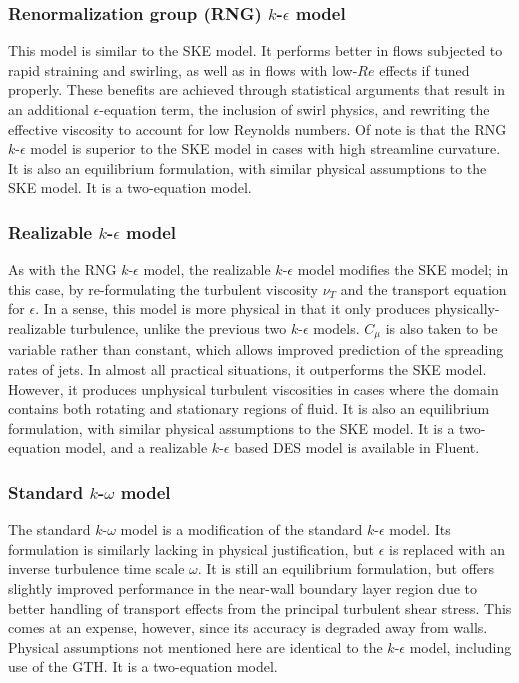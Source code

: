 \documentclass[11pt]{article}
\begin{document}
\subsubsection{Renormalization group (RNG) $k$-$\epsilon$ model}

This model is similar to the SKE model. It performs better in flows subjected to rapid straining and swirling, as well as in flows with low-$Re$ effects if tuned properly. These benefits are achieved through statistical arguments that result in an additional $\epsilon$-equation term, the inclusion of swirl physics, and rewriting the effective viscosity to account for low Reynolds numbers. Of note is that the RNG $k$-$\epsilon$ model is superior to the SKE model in cases with high streamline curvature. It is also an equilibrium formulation, with similar physical assumptions to the SKE model. It is a two-equation model.

\subsubsection{Realizable $k$-$\epsilon$ model}

As with the RNG $k$-$\epsilon$ model, the realizable $k$-$\epsilon$ model modifies the SKE model; in this case, by re-formulating the turbulent viscosity $\nu_T$ and the transport equation for $\epsilon$. In a sense, this model is more physical in that it only produces physically-realizable turbulence, unlike the previous two $k$-$\epsilon$ models. $C_\mu$ is also taken to be variable rather than constant, which allows improved prediction of the spreading rates of jets. In almost all practical situations, it outperforms the SKE model. However, it produces unphysical turbulent viscosities in cases where the domain contains both rotating and stationary regions of fluid. It is also an equilibrium formulation, with similar physical assumptions to the SKE model. It is a two-equation model, and a realizable $k$-$\epsilon$ based DES model is available in Fluent.

\subsubsection{Standard $k$-$\omega$ model}

The standard $k$-$\omega$ model is a modification of the standard $k$-$\epsilon$ model. Its formulation is similarly lacking in physical justification, but $\epsilon$ is replaced with an inverse turbulence time scale $\omega$. It is still an equilibrium formulation, but offers slightly improved performance in the near-wall boundary layer region due to better handling of transport effects from the principal turbulent shear stress. This comes at an expense, however, since its accuracy is degraded away from walls. Physical assumptions not mentioned here are identical to the $k$-$\epsilon$ model, including use of the GTH. It is a two-equation model.
\end{document}
